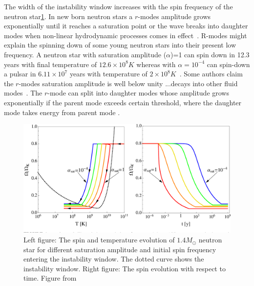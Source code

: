\documentclass{ttuthes2007}
\begin{document}
The width of the instability window increases with the spin
frequency of the neutron star\ref{fig:instability}. In new born neutron stars a
$r$-modes amplitude grows exponentially until it reaches a saturation point or
the wave breaks into daughter modes when non-linear hydrodynamic processes
comes in effect~\cite{Owen_1998}. R-modes might explain the spinning down of
some young
neutron stars into their present low frequency. A neutron star with
saturation amplitude ($\alpha$)=1 can spin down in 12.3 years with final
temperature of $12.6 \times 10^8 K$ whereas with $\alpha=10^{-4}$ can spin-down a
pulsar in $6.11 \times 10^7$ years with temperature of $2 \times 10^8
K$~\cite{Alford_2014}. Some authors claim  the
$r$-modes saturation amplitude is well below unity ...decays into other fluid modes~\cite{Gressman_2002}. The $r$-mode can split
into daughter modes whose amplitude grows exponentially if the parent mode
exceeds certain threshold, where the daughter mode takes energy from parent mode
\cite{Arras_2003}.
\begin{figure}[bht!]                                                            
        \includegraphics[width=\textwidth]{figure/rmodesamplitude.png}                         
	\caption{Left figure: The spin and temperature  evolution of $1.4 M_\odot$ neutron star
for different saturation amplitude and initial spin frequency entering the
instability window. The dotted curve shows the instability window. Right figure: The spin evolution with respect to time. Figure from ~\cite{Alford_2014}}
        \label{fig:instability}                                                     
\end{figure}  
\end{document}
